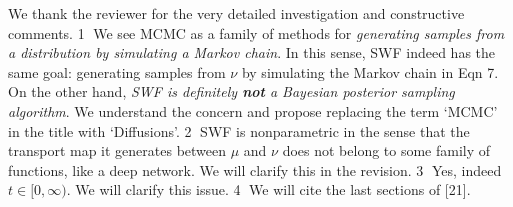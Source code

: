 \documentclass{article}
\newcommand{\rev}[1]{{\color{red} #1}}
\newcommand{\alain}[1]{{\color{cyan} #1}}
\newcommand{\ubul}[1]{{\large \color{red} \textcircled{\small #1}}}
\begin{document}
%
We thank the reviewer for the very detailed investigation and constructive comments. %
%
%
\ubul{1} We see MCMC as a family of methods for \emph{generating samples from a distribution by simulating a Markov chain}. In this sense, SWF indeed has the same goal: generating samples from $\nu$ by simulating the Markov chain in Eqn 7. On the other hand, \emph{SWF is definitely \textbf{not} a Bayesian posterior sampling algorithm}. We understand the concern and propose replacing the term `MCMC' in the title with `Diffusions'.
%
%
\ubul{2} SWF is nonparametric in the sense that the transport map it generates between $\mu$ and $\nu$ does not belong to some family of functions, like a deep network.
We will clarify this in the revision.
%
%
\ubul{3} Yes, indeed $t \in [0, \infty)$. We will clarify this issue.
%
%
\ubul{4} We will cite the last sections of [21]. %
%
%
\end{document}
